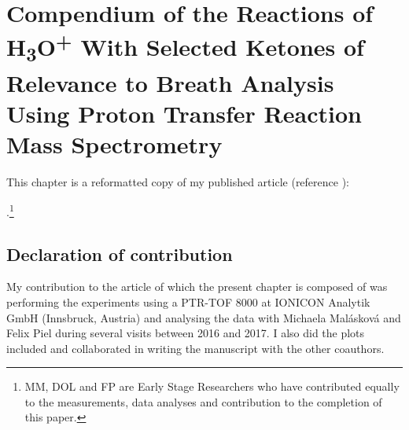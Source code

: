 
\chapter{Compendium of the Reactions of H\textsubscript{3}O\textsuperscript{+} With Selected Ketones of Relevance to Breath Analysis Using Proton Transfer Reaction Mass Spectrometry}



This chapter is a reformatted copy of my published article (reference \cite{malaskova2019compendium}):

.\footnote{MM, DOL and FP are
Early Stage Researchers who have contributed equally to the measurements, data analyses and contribution to the completion of this paper.}







\section*{Declaration of contribution}
My contribution to the article of which the present chapter is composed of was
performing the experiments using a PTR-TOF 8000 at IONICON Analytik GmbH (Innsbruck, Austria) and analysing the data with Michaela Mal\'askov\'a and Felix Piel during several visits between 2016 and 2017. I also did  the plots included and collaborated in writing the manuscript with the other coauthors. 


